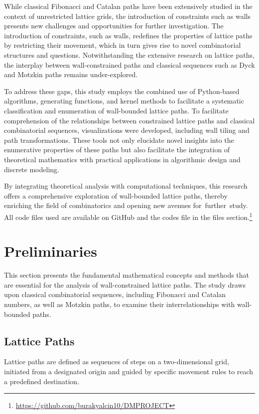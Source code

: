 \documentclass{article}
\begin{document}
 While classical Fibonacci and Catalan paths have been extensively studied in the context of unrestricted lattice grids, the introduction of constraints such as walls presents new challenges and opportunities for further investigation. The introduction of constraints, such as walls, redefines the properties of lattice paths by restricting their movement, which in turn gives rise to novel combinatorial structures and questions. Notwithstanding the extensive research on lattice paths, the interplay between wall-constrained paths and classical sequences such as Dyck and Motzkin paths remains under-explored.

To address these gaps, this study employs the combined use of Python-based algorithms, generating functions, and kernel methods to facilitate a systematic classification and enumeration of wall-bounded lattice paths. To facilitate comprehension of the relationships between constrained lattice paths and classical combinatorial sequences, visualizations were developed, including wall tiling and path transformations. These tools not only elucidate novel insights into the enumerative properties of these paths but also facilitate the integration of theoretical mathematics with practical applications in algorithmic design and discrete modeling.

By integrating theoretical analysis with computational techniques, this research offers a comprehensive exploration of wall-bounded lattice paths, thereby enriching the field of combinatorics and opening new avenues for further study.
All code files used are available on GitHub and the codes file in the files section.\footnote{\url{https://github.com/burakyalcin10/DMPROJECT}}

\section{Preliminaries}

This section presents the fundamental mathematical concepts and methods that are essential for the analysis of wall-constrained lattice paths. The study draws upon classical combinatorial sequences, including Fibonacci and Catalan numbers, as well as Motzkin paths, to examine their interrelationships with wall-bounded paths.

\subsection{Lattice Paths}
Lattice paths are defined as sequences of steps on a two-dimensional grid, initiated from a designated origin and guided by specific movement rules to reach a predefined destination. 
\end{document}
